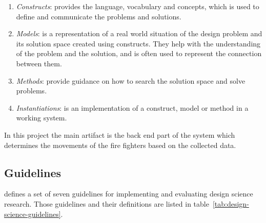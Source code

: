 \documentclass[../Main/thesis.tex]{subfiles}
\begin{document}
\begin{enumerate}
	\item \textit{Constructs}: provides the language, vocabulary and concepts, which is used to define and communicate the problems and solutions.
	\item \textit{Models}: is a representation of a real world situation of the design problem and its solution space created using constructs. They help with the understanding of the problem and the solution, and is often used to represent the connection between them. 
	\item \textit{Methods}: provide guidance on how to search the solution space and solve problems.
	\item \textit{Instantiations}: is an implementation of a construct, model or method in a working system.
\end{enumerate}

In this project the main artifact is the back end part of the system which determines the movements of the fire fighters based on the collected data.

\subsection{Guidelines}
\citet{hevner2004design} defines a set of seven guidelines for implementing and evaluating design science research.
Those guidelines and their definitions are listed in table~\ref{tab:design-science-guidelines}.
\end{document}
